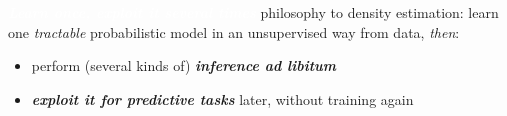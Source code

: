 \documentclass[xcolor={usenames,dvipsnames,svgnames}, compress]{beamer}
\newcommand{\highlighttext}[2][yellow]{{\colorbox{#1}{\textcolor{white}{#2}}}}
\newcommand{\customcite}[1]{\footnote{\tiny \citeauthor{#1}, \citetitle{#1}, \citeyear{#1}}}
\begin{document}
\begin{frame}[t]
  \highlighttext[tomato0]{\textbf{\emph{Learn once, exploit it several times}}} philosophy to
  density estimation: learn one \emph{tractable} probabilistic model
  in an unsupervised way from data, \emph{then}:
  \begin{itemize}
  \item perform (several kinds of) \emph{\textbf{inference ad
        libitum}}
    \item \emph{\textbf{exploit it for predictive tasks}} later, without training again
  \end{itemize}

\end{frame}

    
\end{document}

